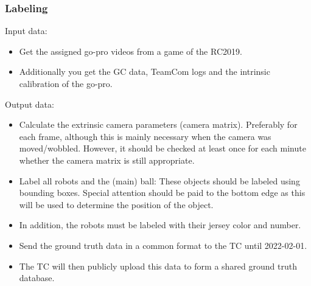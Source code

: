     \subsubsection{Labeling}
        Input data:
        \begin{itemize}
            \item Get the assigned go-pro videos from a game of the RC2019.
            \item Additionally you get the GC data, TeamCom logs and the intrinsic calibration of the go-pro.
        \end{itemize}

        Output data:
        \begin{itemize}
            \item Calculate the extrinsic camera parameters (camera matrix). Preferably for each frame, although this is mainly necessary when the camera was moved/wobbled. However, it should be checked at least once for each minute whether the camera matrix is still appropriate.
            \item Label all robots and the (main) ball: These objects should be labeled using bounding boxes. Special attention should be paid to the bottom edge as this will be used to determine the position of the object.
            \item In addition, the robots must be labeled with their jersey color and number.
            \item Send the ground truth data in a common format  to the TC until 2022-02-01.
            \item The TC will then publicly upload this data to form a shared ground truth database.
        \end{itemize}
